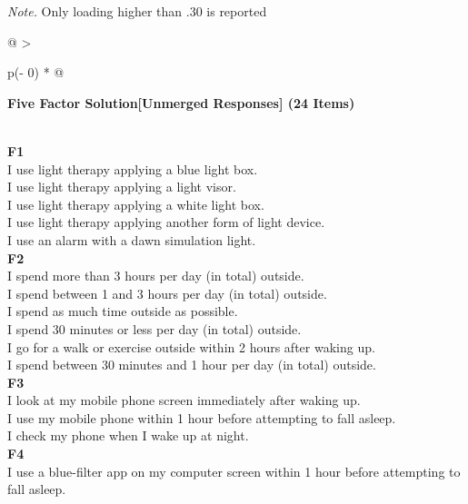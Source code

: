 \documentclass[
  english,
  man]{apa6}
\begin{document}
\begin{appendix}
\begin{table}[h]
\begin{center}
\begin{threeparttable}
{}

\begin{tablenotes}[para]
\normalsize{\textit{Note.} Only loading higher than .30 is reported}
\end{tablenotes}

\end{threeparttable}
\end{center}

\end{table}

\begin{longtable}[]{@{}
  >{\raggedright\arraybackslash}p{(\columnwidth - 0\tabcolsep) * }@{}}
\toprule
\begin{minipage}[b]{\linewidth}\raggedright
\textbf{Five Factor Solution{[}Unmerged Responses{]} (24 Items)}
\end{minipage} \\
\midrule
\endhead
\textbf{F1} \\
I use light therapy applying a blue light box. \\
I use light therapy applying a light visor. \\
I use light therapy applying a white light box. \\
I use light therapy applying another form of light device. \\
I use an alarm with a dawn simulation light. \\
\textbf{F2} \\
I spend more than 3 hours per day (in total) outside. \\
I spend between 1 and 3 hours per day (in total) outside. \\
I spend as much time outside as possible. \\
I spend 30 minutes or less per day (in total) outside. \\
I go for a walk or exercise outside within 2 hours after waking up. \\
I spend between 30 minutes and 1 hour per day (in total) outside. \\
\textbf{F3} \\
I look at my mobile phone screen immediately after waking up. \\
I use my mobile phone within 1 hour before attempting to fall asleep. \\
I check my phone when I wake up at night. \\
\textbf{F4} \\
I use a blue-filter app on my computer screen within 1 hour before
attempting to fall asleep. \\

\end{longtable}
\end{appendix}
\end{document}
